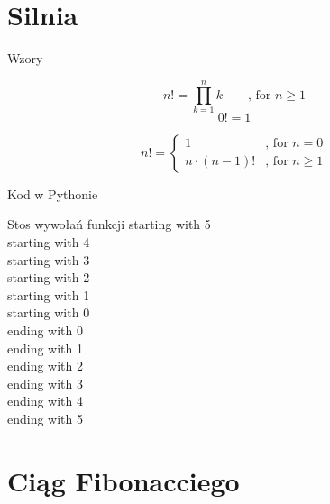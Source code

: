 
\section{Silnia}\label{sec:silnia}
\begin{frame}{Wzory}
    \begin{definition}
        \[ n! = \prod\limits_{k = 1}^{n}k \qquad \text{, for } n \geq 1 \]
        \[ 0! = 1 \]
    \end{definition}
    \begin{definition}[recursion]
        \[ n! =
        \begin{cases}
            1 & \text{, for } n = 0 \\
            n \cdot (n - 1)! & \text{, for } n \geq 1
        \end{cases}
        \]
    \end{definition}
\end{frame}
\begin{frame}[fragile]{Kod w Pythonie}
    
\end{frame}
\begin{frame}{Stos wywołań funkcji}
    \centering
    starting with 5\\
    starting with 4\\
    starting with 3\\
    starting with 2\\
    starting with 1\\
    starting with 0\\
    ending with 0\\
    ending with 1\\
    ending with 2\\
    ending with 3\\
    ending with 4\\
    ending with 5\\
\end{frame}
\section{Ciąg Fibonacciego}\label{sec:ciągFibonacciego}


